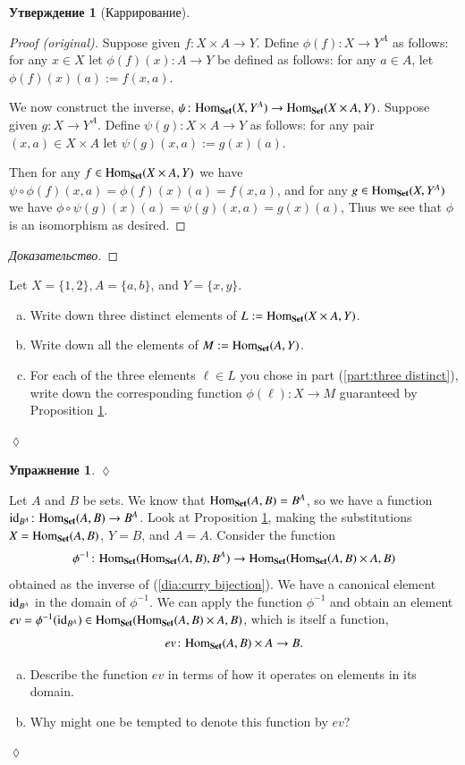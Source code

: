 \documentclass[a4paper]{book}
\def\tn{\textnormal}
\def\Hom{\tn{Hom}}
\def\to{\rightarrow}
\def\taking{\colon}
\def\m1{{-1}}
\def\id{\tn{id}}
\def\Set{{\bf Set}}
\theoremstyle{myth}
\newtheorem{excENG}[envENG]{\begin{english}Exercise\end{english}}
\newenvironment{proofENG}{\begin{proof}[Proof (original)]}{\end{proof}}
\newenvironment{exerciseENG}{\begin{excENG}}{\hspace*{\fill}$\lozenge$\end{excENG}}
\newtheorem{propositionRUS}[envRUS]{Утверждение}
\newtheorem{excRUS}[envRUS]{Упражнение}
\newenvironment{proofRUS}{\begin{proof}[Доказательство]}{\end{proof}}
\newenvironment{exerciseRUS}{\begin{excRUS}}{\hspace*{\fill}$\lozenge$\end{excRUS}}
\def\sexc{\begin{enumerate}[a.)]\setlength{\itemsep}{.1cm}\setlength{\parskip}{.1cm}\item}
\def\next{\item}
\def\endsexc{\end{enumerate}}
\begin{document}
\begin{russian}
\begin{propositionRUS}[Каррирование]\label{prop:curry}
 
\end{propositionRUS}

\begin{proofENG}
Suppose given $f\taking X\times A\to Y$. Define $\phi(f)\taking X\to Y^A$ as follows: for any $x\in X$ let $\phi(f)(x)\taking A\to Y$ be defined as follows: for any $a\in A$, let $\phi(f)(x)(a):=f(x,a)$. 

We now construct the inverse, $\psi\taking\Hom_\Set(X,Y^A)\to\Hom_\Set(X\times A,Y)$. Suppose given $g\taking X\to Y^A$. Define $\psi(g)\taking X\times A\to Y$ as follows: for any pair $(x,a)\in X\times A$ let $\psi(g)(x,a):=g(x)(a)$. 

Then for any $f\in\Hom_\Set(X\times A,Y)$ we have $\psi\circ\phi(f)(x,a)=\phi(f)(x)(a)=f(x,a)$, and for any $g\in\Hom_\Set(X,Y^A)$ we have $\phi\circ\psi(g)(x)(a)=\psi(g)(x,a)=g(x)(a)$, Thus we see that $\phi$ is an isomorphism as desired.
\end{proofENG}

\begin{proofRUS}
 
\end{proofRUS}

\begin{exerciseENG}
Let $X=\{1,2\}, A=\{a,b\}$, and $Y=\{x,y\}$. 
\sexc\label{part:three distinct} Write down three distinct elements of $L:=\Hom_\Set(X\times A,Y)$. 
\next Write down all the elements of $M:=\Hom_\Set(A,Y)$. 
\next For each of the three elements $\ell\in L$ you chose in part (\ref{part:three distinct}), write down the corresponding function $\phi(\ell)\taking X\to M$ guaranteed by Proposition \ref{prop:curry}.
\endsexc
\end{exerciseENG}

\begin{exerciseRUS}
 
\end{exerciseRUS}

\begin{exerciseENG}\label{exc:evaluation}
Let $A$ and $B$ be sets. We know that $\Hom_\Set(A,B)=B^A$, so we have a function $\id_{B^A}\taking\Hom_\Set(A,B)\to B^A$. Look at Proposition \ref{prop:curry}, making the substitutions $X=\Hom_\Set(A,B)$, $Y=B$, and  $A=A$. Consider the function $$\phi^\m1\taking\Hom_\Set(\Hom_\Set(A,B),B^A)\to\Hom_\Set(\Hom_\Set(A,B)\times A,B)$$ obtained as the inverse of (\ref{dia:curry bijection}). We have a canonical element $\id_{B^A}$ in the domain of $\phi^\m1$. We can apply the function $\phi^\m1$ and obtain an element $ev=\phi^\m1(\id_{B^A})\in\Hom_\Set(\Hom_\Set(A,B)\times A,B)$, which is itself a function, $$ev\taking\Hom_\Set(A,B)\times A\to B.$$ 
\sexc Describe the function $ev$ in terms of how it operates on elements in its domain. 
\next Why might one be tempted to denote this function by $ev$?
\endsexc
\end{exerciseENG}


\end{russian}
\end{document}
